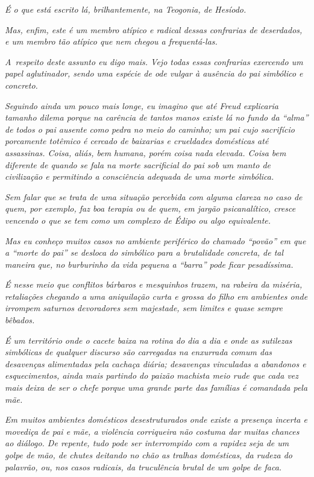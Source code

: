 \emph{É o que está escrito lá, brilhantemente, na Teogonia, de
Hesíodo.}

\emph{Mas, enfim, este  é um membro atípico e radical dessas
confrarias de deserdados, e um membro tão atípico que nem chegou a
frequentá-las.}

\emph{A~respeito deste assunto eu digo mais. Vejo todas essas confrarias
exercendo um papel aglutinador, sendo uma espécie de ode vulgar à
ausência do pai simbólico e concreto.}

\emph{Seguindo ainda um pouco mais longe, eu imagino que até Freud
explicaria tamanho dilema porque na carência de tantos manos existe lá
no fundo da ``alma'' de todos o pai ausente como pedra no meio do
caminho; um pai cujo sacrifício porcamente totêmico é cercado de
baixarias e crueldades domésticas até assassinas. Coisa, aliás, bem
humana, porém coisa nada elevada. Coisa bem diferente de quando se fala
na morte sacrificial do pai sob um manto de civilização e permitindo a
consciência adequada de uma morte simbólica.}

\emph{Sem falar que se trata de uma situação percebida com alguma
clareza no caso de quem, por exemplo, faz boa terapia ou de quem, em
jargão psicanalítico, cresce vencendo o que se tem como um complexo de
Édipo ou algo equivalente.}

\emph{Mas eu conheço muitos casos no ambiente periférico do chamado
``povão'' em que a ``morte do pai'' se desloca do simbólico para a
brutalidade concreta, de tal maneira que, no burburinho da vida pequena
a ``barra'' pode ficar pesadíssima.}

\emph{É nesse meio que conflitos bárbaros e mesquinhos trazem, na
rabeira da miséria, retaliações chegando a uma aniquilação curta e
grossa do filho em ambientes onde irrompem saturnos devoradores sem
majestade, sem limites e quase sempre bêbados.}

\emph{É um território onde o cacete baixa na rotina do dia a dia e onde
as sutilezas simbólicas de qualquer discurso são carregadas na enxurrada
comum das desavenças alimentadas pela cachaça diária; desavenças
vinculadas a abandonos e esquecimentos, ainda mais partindo do paizão
machista meio rude que cada vez mais deixa de ser o chefe porque uma
grande parte das famílias é comandada pela mãe.}

\emph{Em muitos ambientes domésticos desestruturados onde existe a
presença incerta e movediça de pai e mãe, a violência corriqueira não
costuma dar muitas chances ao diálogo. De repente, tudo pode ser
interrompido com a rapidez seja de um golpe de mão, de chutes deitando
no chão as tralhas domésticas, da rudeza do palavrão, ou, nos casos
radicais, da truculência brutal de um golpe de faca.}

